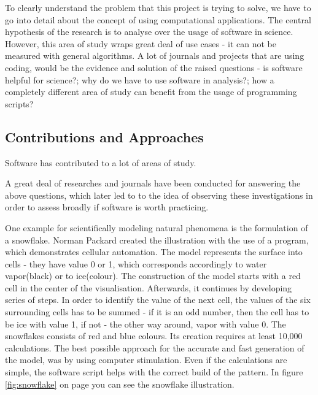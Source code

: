 
To clearly understand the problem that this project is trying to solve, we have to go into detail about the concept of using computational applications. The central hypothesis of the research is to analyse over the usage of software in science. However, this area of study wraps great deal of use cases - it can not be measured with general algorithms. A lot of journals and projects that are using coding, would be the evidence and solution of the raised questions - is software helpful for science?; why do we have to use software in analysis?; how a completely different area of study can benefit from the usage of programming scripts? 

\subsection*{Contributions and Approaches}

Software has contributed to a lot of areas of study.

A great deal of researches and journals have been conducted for answering the above questions, which later led to to the idea of observing these investigations in order to assess broadly if software is worth practicing. 

One example for scientifically modeling natural phenomena is the formulation of a snowflake. Norman Packard created the illustration with the use of a program, which demonstrates cellular automation.\cite{wolfram1984computer}\cite{packard1986lattice} The model represents the surface into cells - they have value 0 or 1, which corresponds accordingly to water vapor(black) or to ice(colour). The construction of the model starts with a red cell in the center of the visualisation. Afterwards, it continues by developing series of steps. In order to identify the value of the next cell, the values of the six surrounding cells has to be summed - if it is an odd number, then the cell has to be ice with value 1, if not - the other way around, vapor with value 0. The snowflakes consists of red and blue colours. Its creation requires at least 10,000 calculations. The best possible approach for the accurate and fast generation of the model, was by using computer stimulation. Even if the calculations are simple, the software script helps with the correct build of the pattern.\cite{wolfram1984computer} In figure \ref{fig:snowflake} on page \pageref{fig:snowflake} you can see the snowflake illustration.

